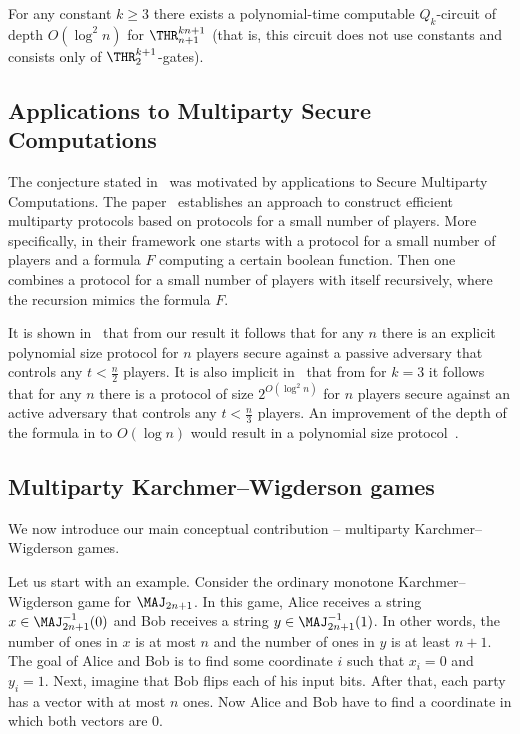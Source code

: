 \begin{theorem}
\label{cohen_2}
For any constant $k\ge 3$ 
there exists a polynomial-time computable
%
%
%
$Q_k$-circuit 
of depth  $O(\log^2 n)$  %
for $\THR^{k n + 1}_{n + 1}$ (that is, this circuit does not use constants
and consists only of $\THR^{k+1}_2$-gates).
\end{theorem}


\subsection{Applications to Multiparty Secure Computations}

The conjecture stated in~\cite{Cohen2013} was motivated by applications to Secure Multiparty Computations. The paper~\cite{Cohen2013} establishes an approach to construct efficient multiparty protocols based on protocols for a small number of players. More specifically, in their framework one starts with a protocol for a small number of players and a formula $F$ computing a certain boolean function. Then one combines a protocol for a small number of players with itself recursively, where the recursion mimics the formula $F$.

It is shown in~\cite{Cohen2013} that from our result it follows that for any $n$ there is an explicit polynomial size protocol for $n$ players secure against a passive adversary that controls any $t < \frac n2$ players. It is also implicit in~\cite{Cohen2013} that from  for $k=3$ it follows that for any $n$ there is a protocol of size $2^{O(\log^2 n)}$ for $n$ players secure against an active adversary that controls any $t < \frac n3$ players. An improvement of the depth of the formula in  to $O(\log n)$ would result in a polynomial size protocol~\cite{Cohen2013}. 



\subsection{Multiparty Karchmer--Wigderson games}

We now introduce our main conceptual contribution -- multiparty Karchmer--Wigderson games.


 Let us start with an example. Consider the ordinary monotone Karchmer--Wigderson game for $\MAJ_{2n + 1}$. In this game, Alice receives a string $x\in \MAJ_{2n + 1}^{-1}(0)$ and Bob receives a string $y \in\MAJ_{2n + 1}^{-1}(1)$. In other words, the number of ones in $x$ is at most $n$ and the number of ones in $y$ is at least  $n + 1$. The goal of Alice and Bob is to find some coordinate $i$ such that $x_i = 0$ and $y_i = 1$. Next, imagine that Bob flips each of his input bits. After that, each party has a vector with at most $n$ ones. Now Alice and Bob have to find a coordinate in which both vectors are $0$.

